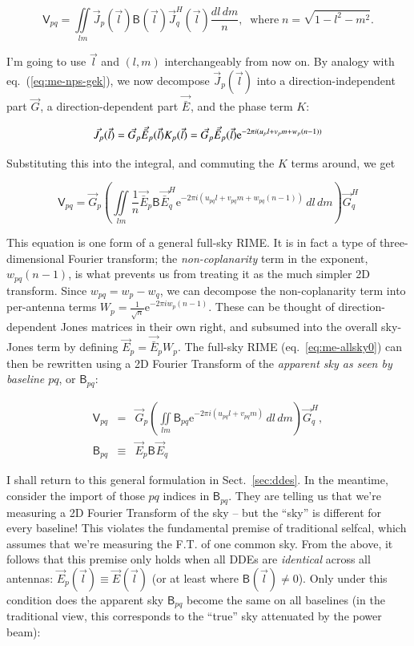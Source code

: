 \documentclass[]{aa}
\newcommand{\herm}{H}
\newcommand{\jones}[2]{\vec {#1}_{#2}}
\newcommand{\jonesT}[2]{\vec {#1}^{\herm}_{#2}}
\newcommand{\coh}[2]{\mathsf{{#1}}_{{#2}}}
\begin{document}
\[
\coh{V}{pq} = \iint\limits_{lm} \jones{J}{p}(\vec l) \coh{B}{}(\vec l) \jonesT{J}{q}(\vec l) \frac{dl\,dm}{n},
\;\;\mathrm{where}\; n=\sqrt{1-l^2-m^2}.
\]

I'm going to use $\vec l$ and $(l,m)$ interchangeably from now on. By analogy with eq.~(\ref{eq:me-nps-gek}), we now decompose $\jones{J}{p}(\vec l)$ into a direction-independent part $\jones{G}{}$, a direction-dependent part $\jones{\bar E}{}$, and the phase term $K$:

\[
\jones{J}{p}(\vec l) = \jones{G}{p}\jones{\bar E}{p}(\vec l) K_p(\vec l) = \jones{G}{p}\jones{\bar E}{p}(\vec l) {\rm e}^{-2\pi i(u_p l+v_p m+w_p (n-1))}
\]

Substituting this into the integral, and commuting the $K$ terms around, we get

\begin{equation}\label{eq:me-allsky0}
\coh{V}{pq} = \jones{G}{p} \left( \iint\limits_{lm} \frac{1}{n} \jones{\bar E}{p} \coh{B}{} \jonesT{\bar E}{q} \mathrm{e} ^{-2\pi i(u_{pq} l+v_{pq} m+w_{pq} (n-1))} \,dl\,dm \right) \jonesT{G}{q}
\end{equation}

This equation is one form of a general full-sky RIME. It is in fact a type of three-dimensional Fourier transform; the \emph{non-coplanarity} term in the exponent, $w_{pq}(n-1)$, is what prevents us from treating it as the much simpler 2D transform. Since $w_{pq}=w_p-w_q$, we can decompose the non-coplanarity term into per-antenna terms $W_p=\frac{1}{\sqrt{n}} \mathrm{e}^{-2\pi i w_p (n-1)}$. These can be thought of direction-dependent Jones matrices in their own right, and subsumed into the overall sky-Jones term by defining $\jones{E}{p} = \jones{\bar E}{p}W_p$. The full-sky RIME (eq.~\ref{eq:me-allsky0}) can then be rewritten using a 2D Fourier Transform of the \emph{apparent sky as seen by baseline $pq$}, or $\coh{B}{pq}$:

\begin{eqnarray}\label{eq:me-allsky}
\coh{V}{pq} & = & \jones{G}{p} \left( \iint\limits_{lm} \coh{B}{pq} \mathrm{e} ^{-2\pi i(u_{pq} l+v_{pq} m)} \,dl\,dm \right) \jonesT{G}{q}, \\
\nonumber \coh{B}{pq} & \equiv & \jones{E}{p} \coh{B}{} \jones{E}{q}
\end{eqnarray}

I shall return to this general formulation in Sect.~\ref{sec:ddes}. In the meantime, consider the import of those $pq$ indices in $\coh{B}{pq}$. They are telling us that we're measuring a 2D Fourier Transform of the sky -- but the ``sky'' is different for every baseline! This violates the fundamental premise of traditional selfcal, which assumes that we're measuring the F.T. of one common sky. From the above, it follows that this premise only holds when all DDEs are \emph{identical} across all antennas: $\jones{E}{p}(\vec l) \equiv \jones{E}{}(\vec l)$ (or at least where $\coh{B}{}(\vec l) \ne 0$). Only under this condition does the apparent sky $\coh{B}{pq}$ become the same on all baselines (in the traditional view, this corresponds to the ``true'' sky attenuated by the power beam):
\end{document}
